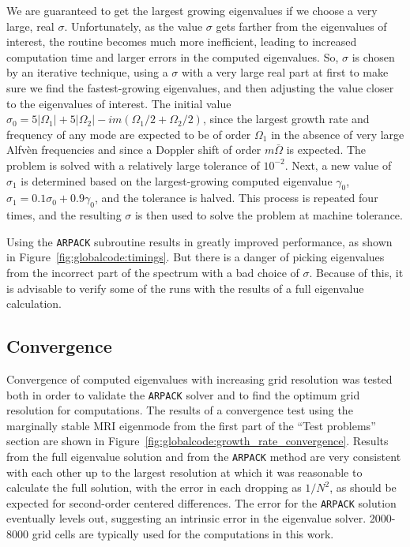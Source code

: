 \documentclass[letterpaper]{article}
\begin{document}
We are guaranteed to get the largest growing eigenvalues if we choose
a very large, real $\sigma$. Unfortunately, as the value $\sigma$ gets
farther from the eigenvalues of interest, the routine becomes much
more inefficient, leading to increased computation time and larger
errors in the computed eigenvalues. So, $\sigma$ is chosen by an
iterative technique, using a $\sigma$ with a very large real part at
first to make sure we find the fastest-growing eigenvalues, and then
adjusting the value closer to the eigenvalues of interest. The initial
value $\sigma_0 = 5|\Omega_1| + 5|\Omega_2| - im(\Omega_1/2 +
\Omega_2/2)$, since the largest growth rate and frequency of any mode
are expected to be of order $\Omega_1$ in the absence of very large
Alfv\`{e}n frequencies and since a Doppler shift of order $m\bar{\Omega}$ is
expected. The problem is solved with a relatively large tolerance of
$10^{-2}$. Next, a new value of $\sigma_1$ is determined based on the
largest-growing computed eigenvalue $\gamma_0$, $\sigma_1 =
0.1\sigma_0 + 0.9\gamma_0$, and the tolerance is halved. This process
is repeated four times, and the resulting $\sigma$ is then used to
solve the problem at machine tolerance.

Using the \texttt{ARPACK} subroutine results in greatly improved
performance, as shown in Figure~\ref{fig:globalcode:timings}. But
there is a danger of picking eigenvalues from the incorrect part of
the spectrum with a bad choice of $\sigma$. Because of this, it is
advisable to verify some of the runs with the results of a full
eigenvalue calculation.

\subsection{Convergence}

Convergence of computed eigenvalues with increasing grid resolution
was tested both in order to validate the \texttt{ARPACK} solver and to
find the optimum grid resolution for computations. The results of a
convergence test using the marginally stable MRI eigenmode from the
first part of the ``Test problems'' section are shown in
Figure~\ref{fig:globalcode:growth_rate_convergence}. Results from the
full eigenvalue solution and from the \texttt{ARPACK} method are very
consistent with each other up to the largest resolution at which it
was reasonable to calculate the full solution, with the error in each
dropping as $1/N^2$, as should be expected for second-order centered
differences. The error for the \texttt{ARPACK} solution eventually
levels out, suggesting an intrinsic error in the eigenvalue
solver. 2000-8000 grid cells are typically used for the computations
in this work.
\end{document}
